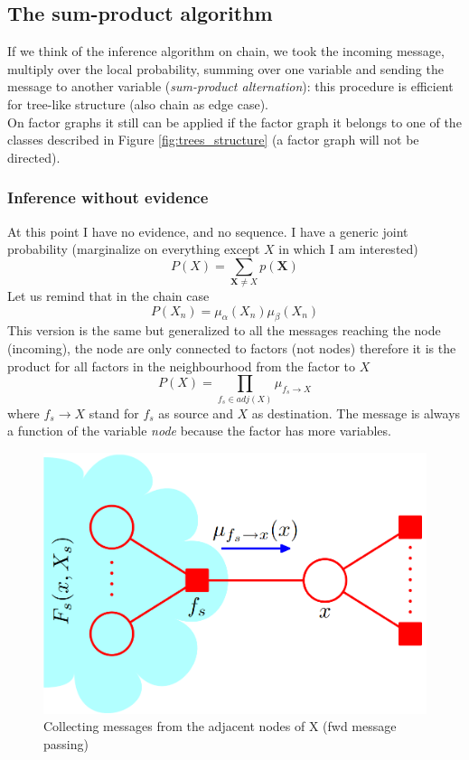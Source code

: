 \subsection{The sum-product algorithm}
If we think of the inference algorithm on chain, we took the incoming message, multiply
over the local probability, summing over one variable and sending the message to
another variable (\textit{sum-product alternation}): this procedure is efficient
for tree-like structure (also chain as edge case).\\ On factor graphs it still
can be applied if the factor graph it belongs to one of the classes described in
Figure \ref{fig:trees_structure} (a factor graph will not be directed).

\subsubsection{Inference without evidence}
At this point I have no evidence, and no sequence. I have a generic joint
probability (marginalize on everything except $X$ in which I am interested)
\[
	P(X) = \sum_{\textbf{X} \neq X}p(\textbf{X})
\]
Let us remind that in the chain case
\[
	P(X_{n}) = \mu_{\alpha} (X_{n}) \mu_{\beta}(X_{n})
\]
This version is the same but generalized to all the messages reaching the node (incoming),
the node are only connected to factors (not nodes) therefore it is the product for
all factors in the neighbourhood from the factor to $X$
\[
	P(X) = \prod_{f_s \in adj(X)}\mu_{f_s \rightarrow X}
\]
where $f_{s} \rightarrow X$ stand for $f_{s}$ as source and $X$ as destination.
The message is always a function of the variable \textit{node} because the factor
has more variables.
\begin{figure}[H]
	\centering
	\includegraphics[scale=0.3]{
		images/09_BayesianNetworksInference_forwardMessagePassing.png
	}
	\caption{Collecting messages from the adjacent nodes of X (fwd message passing)}
	\label{fig:message_BN_fwd}
\end{figure}
